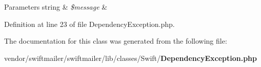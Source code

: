 \begin{DoxyParams}[1]{Parameters}
string & {\em \$message} & \\
\hline
\end{DoxyParams}


Definition at line 23 of file Dependency\+Exception.\+php.



The documentation for this class was generated from the following file\+:\begin{DoxyCompactItemize}
\item 
vendor/swiftmailer/swiftmailer/lib/classes/\+Swift/{\bf Dependency\+Exception.\+php}\end{DoxyCompactItemize}
